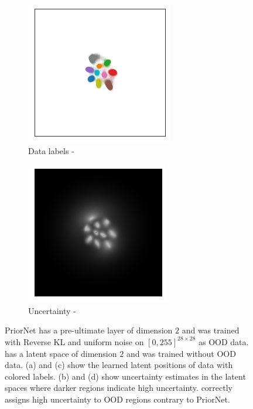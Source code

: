 \begin{figure}[t!]
    \begin{subfigure}[t]{0.23 \columnwidth}
        \centering
        \includegraphics[width=0.8 \textwidth]{figures/2D_latent_ours_bn_2.png}
         \caption{Data labels - \oursacro}
         \label{ours_visualization_2D}
    \end{subfigure}%
    \begin{subfigure}[t]{0.23\columnwidth}
        \centering
        \includegraphics[width=0.8 \textwidth]{figures/2D_latent_ours_bn_1.png}
        \caption{Uncertainty - \oursacro}
        \label{ours_visualization_unc}
    \end{subfigure}%
    \caption{PriorNet has a pre-ultimate layer of dimension $2$ and was trained with Reverse KL and uniform noise on $[0,255]^{28\times28}$ as OOD data. \oursacro has a latent space of dimension $2$ and was trained without OOD data. (a) and (c) show the learned latent positions of data with colored labels. (b) and (d) show uncertainty estimates in the latent spaces where darker regions indicate high uncertainty. \oursacro correctly assigns high uncertainty to OOD regions contrary to PriorNet.}
    \label{fig:mnist_2D_latent_space}
	\vspace{-.5cm}
\end{figure}

